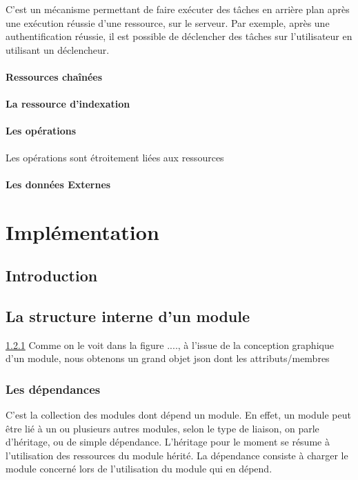 \documentclass[a4paper,11pt]{report}
\begin{document}
C'est un mécanisme permettant de faire exécuter des tâches en arrière plan 
après une exécution réussie d'une ressource, sur le serveur. Par exemple,
après une authentification réussie, il est possible de déclencher des tâches sur 
l'utilisateur en utilisant un déclencheur.


\subsubsection{Ressources chaînées}
\subsubsection{La ressource d'indexation}


\subsubsection{Les opérations}
Les opérations sont étroitement liées aux ressources

\subsubsection{Les données Externes}%


\chapter{Implémentation}

\section{Introduction}

\section{La structure interne d'un module}

\ref{}
Comme on le voit dans la figure ...., à l'issue de la conception graphique d'un
module, nous obtenons un grand objet json dont les attributs/membres 

\subsection{Les dépendances}

C'est la collection des modules dont dépend un module. En effet, un module peut
être lié à un ou plusieurs autres modules, selon le type de liaison,
on parle d'héritage, ou de simple dépendance. L'héritage pour le moment se résume 
à l'utilisation des ressources du module hérité. La dépendance consiste à charger 
le module concerné lors de l'utilisation du module qui en dépend.
\end{document}
